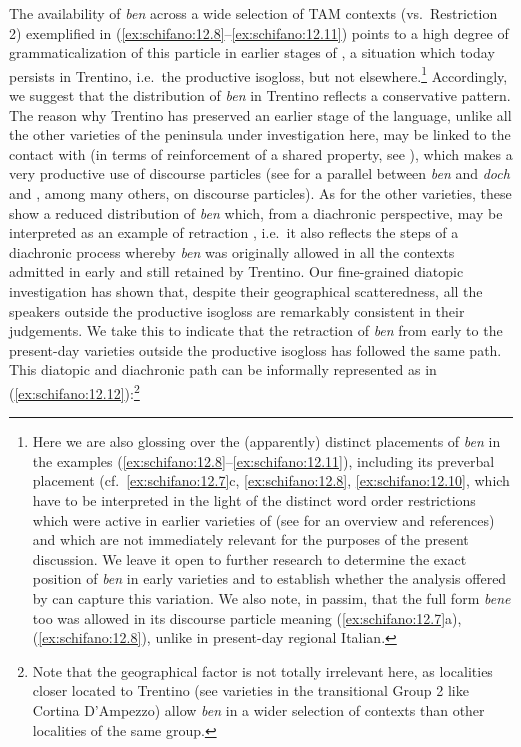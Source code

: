 \documentclass[output=paper]{langsci/langscibook}
\begin{document}
The availability of \emph{ben} across a wide selection of \gls{TAM} contexts
(vs.\ Restriction 2) exemplified in (\ref{ex:schifano:12.8}--\ref{ex:schifano:12.11}) points to a high degree of
grammaticalization of this particle in earlier stages of , a
situation which today persists in Trentino, i.e.\ the productive isogloss, but
not elsewhere.\footnote{Here we are also glossing over the (apparently)
    distinct placements of \emph{ben} in the examples (\ref{ex:schifano:12.8}--\ref{ex:schifano:12.11}), including its
    preverbal placement (cf.\ \ref{ex:schifano:12.7}c, \ref{ex:schifano:12.8}, \ref{ex:schifano:12.10}, which have to be interpreted in
    the light of the distinct word order restrictions which were active in
    earlier varieties of  (see \citealt{Ledgeway2012} for an
    overview and references) and which are not immediately relevant for the
    purposes of the present discussion. We leave it open to further research to
    determine the exact position of \emph{ben} in early  varieties
    and to establish whether the analysis offered by
    \textcite{CognSchi2018b,CognSchi2018} can capture this variation. We also
    note, in passim, that the full form \emph{bene} too was allowed in its
    discourse particle meaning (\ref{ex:schifano:12.7}a), (\ref{ex:schifano:12.8}), unlike in present-day regional
Italian.} Accordingly, we suggest that the distribution of \emph{ben} in
Trentino reflects a conservative pattern. The reason why Trentino has preserved
an earlier stage of the language, unlike all the other varieties of the 
peninsula under investigation here, may be linked to the contact with 
(in terms of reinforcement of a shared property, see \citealt{Beninca1994,%
Cordin2011,Cognola2014}), which makes a very productive use of discourse
particles (see \citealt{CognSchi2018} for a parallel between  \emph{ben}
and  \emph{doch} and \citealt{Weydt1969}, among many others, on 
discourse particles). As for the other varieties, these show a reduced
distribution of \emph{ben} which, from a diachronic perspective, may be
interpreted as an example of retraction \citep{Norde2011}, i.e.\ it also
reflects the steps of a diachronic process whereby \emph{ben} was originally
allowed in all the contexts admitted in early  and still retained
by Trentino. Our fine-grained diatopic investigation has shown that, despite
their geographical scatteredness, all the speakers outside the productive
isogloss are remarkably consistent in their judgements. We take this to
indicate that the retraction of \emph{ben} from early  to the
present-day varieties outside the productive isogloss has followed the same
path. This diatopic and diachronic path can be informally represented as in
(\ref{ex:schifano:12.12}):\footnote{Note that the geographical factor is not totally irrelevant
    here, as localities closer located to Trentino (see varieties in the
transitional Group 2 like Cortina D’Ampezzo) allow \emph{ben} in a wider
selection of contexts than other localities of the same group.}
\end{document}
